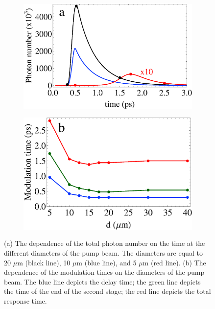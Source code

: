 \documentclass[aps,pra,amsmath,amssymb,onecolumn,superscriptaddress,showpacs,floatfix,]{revtex4-1}
\begin{document}
\begin{figure}[h]
	\centering
	\begin{subfigure}[h]{0.45\linewidth}
		\includegraphics[width=\linewidth]{Fig2a.eps}
	\end{subfigure}
	\begin{subfigure}[h]{0.45\linewidth}
		\includegraphics[width=\linewidth]{Fig2b.eps}
	\end{subfigure}
	\caption{(a) The dependence of the total photon number on the time at the different diameters of the pump beam. The diameters are equal to 20 $\mu$m (black line), 10 $\mu$m (blue line), and 5 $\mu$m (red line). (b) The dependence of the modulation times on the diameters of the pump beam. The blue line depicts the delay time; the green line depicts the time of the end of the second stage; the red line depicts the total response time.}
	\label{fig2}
\end{figure}
\end{document}

